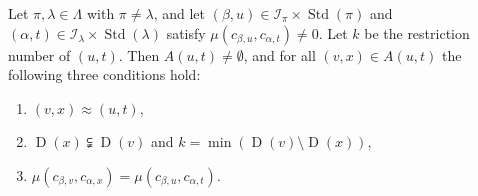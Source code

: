 \documentclass[ALCO,ThmDefs,Unicode,epreuves]{cedram}
\DeclareMathOperator{\STD}{Std}
\DeclareMathOperator{\D}{D}
\begin{document}
\begin{lemm}\label{k-minimallemma}
Let $\pi,\lambda\in\Lambda$ with $\pi\neq\lambda$, and let
$(\beta,u)\in\mathcal{I}_{\pi}\times\STD(\pi)$ and
$(\alpha,t)\in\mathcal{I}_{\lambda}\times\STD(\lambda)$ satisfy
$\mu(c_{\beta,u},c_{\alpha,t}) \neq 0$. Let $k$ be the
restriction number of $(u,t)$. Then $A(u,t)\neq\emptyset$, and for
all $(v,x)\in A(u,t)$ the following three conditions hold\textup{:}
\begin{enumerate}[label=(\roman*),topsep=1 pt]
\item
$(v,x)\approx (u,t)$,
\item
$\D(x)\subsetneqq\D(v)$ and $k=\min(\D(v)\setminus\D(x))$,
\item
$\mu(c_{\beta,v},c_{\alpha,x})=\mu(c_{\beta,u},c_{\alpha,t})$.
\end{enumerate}
\end{lemm}
\end{document}
